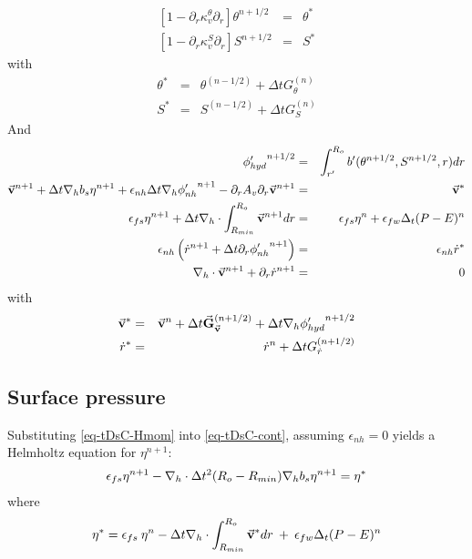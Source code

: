 \begin{eqnarray*}
\left[ 1 - \partial_r \kappa_v^\theta \partial_r \right]
\theta^{n+1/2} & = & \theta^*
\\
\left[ 1 - \partial_r \kappa_v^S \partial_r \right]
S^{n+1/2} & = & S^*
\end{eqnarray*}
with
\begin{eqnarray*}
\theta^* & = &
\theta ^{(n-1/2)} + \Delta t G_{\theta} ^{(n)}
\\
S^* & = &
S ^{(n-1/2)} + \Delta t G_{S} ^{(n)}
\end{eqnarray*}
And 
\begin{eqnarray*}
{\phi'_{hyd}}^{n+1/2} & = & \int_{r'}^{R_o} b'(\theta^{n+1/2},S^{n+1/2},r) dr
\\
\vec{\bf v} ^{n+1}
+ \Delta t {\bf \nabla}_h b_s {\eta}^{n+1}
+ \epsilon_{nh} \Delta t {\bf \nabla}_h {\phi'_{nh}}^{n+1}
- \partial_r A_v \partial_r \vec{\bf v}^{n+1}
& = &
\vec{\bf v}^*
\\
\epsilon_{fs} {\eta}^{n+1} + \Delta t
{\bf \nabla}_h \cdot \int_{R_{min}}^{R_o} \vec{\bf v}^{n+1} dr
& = & 
\epsilon_{fs} {\eta}^{n} + \epsilon_{fw} \Delta_t (P-E)^{n} 
\\
\epsilon_{nh} \left( \dot{r} ^{n+1}
+ \Delta t \partial_r {\phi'_{nh}} ^{n+1}
\right)
& = & \epsilon_{nh} \dot{r}^*
\\
{\bf \nabla}_h \cdot \vec{\bf v}^{n+1} + \partial_r \dot{r}^{n+1}
& = & 0
\end{eqnarray*}
with
\begin{eqnarray*}
\vec{\bf v}^* & = &
\vec{\bf v} ^{n} + \Delta t \vec{\bf G}_{\vec{\bf v}} ^{(n+1/2)}
+ \Delta t  {\bf \nabla}_h {\phi'_{hyd}}^{n+1/2}
\\
\dot{r}^* & = &
\dot{r} ^{n} + \Delta t G_{\dot{r}} ^{(n+1/2)}
\end{eqnarray*}


\subsection{Surface pressure}

Substituting \ref{eq-tDsC-Hmom} into \ref{eq-tDsC-cont}, assuming
$\epsilon_{nh} = 0$ yields a Helmholtz equation for ${\eta}^{n+1}$:
\begin{eqnarray}
\epsilon_{fs} {\eta}^{n+1} -
{\bf \nabla}_h \cdot \Delta t^2 (R_o-R_{min})
{\bf \nabla}_h b_s {\eta}^{n+1}
= {\eta}^*
\label{eq-solve2D}
\end{eqnarray}
where
\begin{eqnarray}
{\eta}^* = \epsilon_{fs} \: {\eta}^{n} -
\Delta t {\bf \nabla}_h \cdot \int_{R_{min}}^{R_o} \vec{\bf v}^* dr
\: + \: \epsilon_{fw} \Delta_t (P-E)^{n} 
\label{eq-solve2D_rhs}
\end{eqnarray}


